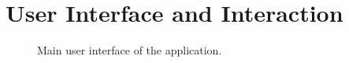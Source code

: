 \section{User Interface and Interaction}

\lipsum[1]

\begin{figure}[H]
	\centering
	\caption{Main user interface of the application.}
	\label{fig:interface}
\end{figure}
